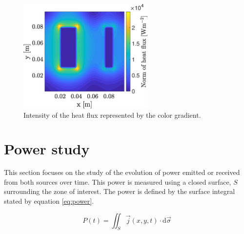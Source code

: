 \documentclass[a4paper,12pt,twoside]{article}
\begin{document}
\begin{figure}[h]
  \centering
  \includegraphics[width=0.6\textwidth]{graphs/c_heat_flux.eps}
  \caption{Intensity of the heat flux represented by the color gradient.}
  \label{fig:c-heat-flux}
\end{figure}
\label{par:heatflux}

\section{Power study}
This section focuses on the study of the evolution of power emitted or received from both sources over time.
This power is measured using a closed surface, $S$ surrounding the zone of interest.
The power is defined by the surface integral stated by equation \eqref{eq:power}.

\begin{equation}
  P(t) = \iint_S \vec{j}(x,y,t)\cdot \text{d}\vec{\sigma}
  \label{eq:power}
\end{equation}
\end{document}
